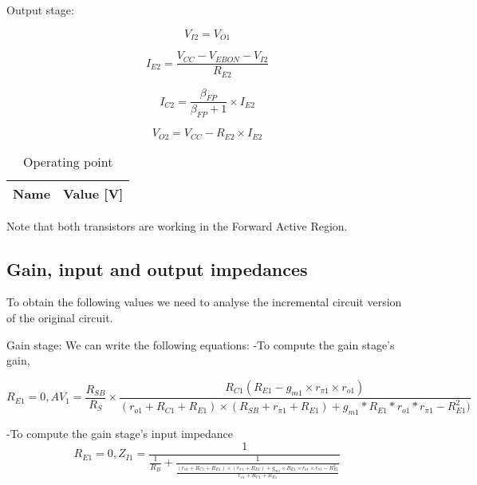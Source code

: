 \quad Output stage:

\begin{equation*}
V_{I2}=V_{O1}
\end{equation*}

\begin{equation*}
I_{E2}=\frac{V_{CC}-V_{EBON}-V_{I2}}{R_{E2}}
\end{equation*}

\begin{equation*}
I_{C2}=\frac{\beta _{FP}}{\beta _{FP}+1} \times I_{E2}
\end{equation*}

\begin{equation*}
V_{O2}=V_{CC}-R_{E2} \times I_{E2}
\end{equation*}

\begin{table}[h]
  \centering
  \begin{tabular}{|l|r|}
    \hline    
    {\bf Name} & {\bf Value [V]} \\ \hline
    
  \end{tabular}
  \caption{Operating point}
  \label{tab:OP}
\end{table}

Note that both transistors are working in the Forward Active Region.


\subsection{Gain, input and output impedances}

To obtain the following values we need to analyse the incremental circuit version of the original circuit.  \par

\quad Gain stage:
We can write the following equations: 
-To compute the gain stage's gain,

\begin{equation} \label{eq5}
R_{E1}=0 , AV_1 = \frac{R_{SB}}{R_S} \times \frac{R_{C1}(R_{E1}-g_{m1}\times r_{\pi 1}\times r_{o1})}{(r_{o1}+R_{C1}+R_{E1})\times(R_{SB}+r_{\pi 1}+R_{E1})+g_{m1}*R_{E1}*r_{o1}*r_{\pi 1} - R_{E1}^2)}
\end{equation}

-To compute the gain stage's input impedance
\begin{equation} \label{eq6}
R_{E1}=0 , Z_{I1} = \frac{1}{\frac{1}{R_B}+\frac{1}{\frac{(r_{o1}+R_{C1}+R_{E1})\times(r_{\pi 1}+R_{E1})+g_{m1}\times R_{E1}\times r_{o1}\times r_{\pi 1} - R_{E1}^2}{r_{o1}+R_{C1}+R_{E1}}}}
\end{equation}

